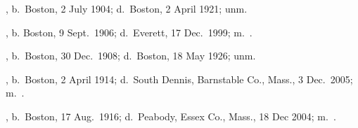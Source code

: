 \begin{Kids}
	, b.\ Boston, 2 July 1904;\cite{Caroline5McGurinBirth} d.\ Boston, 2 April 1921; unm.\cite{Caroline5McGurinDeath}
	
	, b. Boston, 9 Sept.\ 1906;\cite{Catherine5McGurinBirth} d.\ Everett, 17 Dec.\ 1999;\cite{Catherine5McGurinDeath:1} m.\ .\cite{Catherine5McGurinDeath:2}
	
	, b.\ Boston, 30 Dec.\ 1908;\cite{Josephine5McGurinBirth} d.\ Boston, 18 May 1926; unm.\cite{Josephine5McGurinDeath}
	
	, b.\ Boston, 2 April 1914;\cite{John5McGurinBirth} d.\ South Dennis, Barnstable Co., Mass., 3 Dec.\ 2005;\cite{John5McGurinDeath:1} m.\ .\cite{John5McGurinDeath:2}
	
	, b.\ Boston, 17 Aug.\ 1916;\cite{Charles5McGurinBirth} d.\ Peabody, Essex Co., Mass., 18 Dec 2004;\cite{Charles5McGurinDeath:1} m.\ .\cite{Charles5McGurinDeath:2}
\end{Kids}